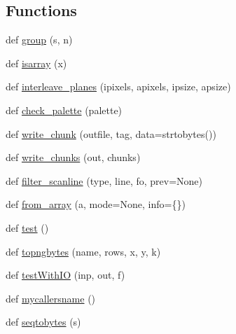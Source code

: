 \subsection*{Functions}
\begin{DoxyCompactItemize}
\item 
def \hyperlink{namespacepygame_1_1tests_1_1test__utils_1_1png_a2e2c0bbe3d6eefa01f7833d3f01041a3}{group} (s, n)
\item 
def \hyperlink{namespacepygame_1_1tests_1_1test__utils_1_1png_acd7de95dee0ef9c5568c707e8cb0582a}{isarray} (x)
\item 
def \hyperlink{namespacepygame_1_1tests_1_1test__utils_1_1png_ab4cb5af9ff32f19b67691f401d12b089}{interleave\+\_\+planes} (ipixels, apixels, ipsize, apsize)
\item 
def \hyperlink{namespacepygame_1_1tests_1_1test__utils_1_1png_a5759868289f0edd9de3d42f8fe7d8e59}{check\+\_\+palette} (palette)
\item 
def \hyperlink{namespacepygame_1_1tests_1_1test__utils_1_1png_a2f029ba4e9282e48376f1dede0ee21d1}{write\+\_\+chunk} (outfile, tag, data=strtobytes(\textquotesingle{}\textquotesingle{}))
\item 
def \hyperlink{namespacepygame_1_1tests_1_1test__utils_1_1png_ae122163baeb50475df9101b869e9cff2}{write\+\_\+chunks} (out, chunks)
\item 
def \hyperlink{namespacepygame_1_1tests_1_1test__utils_1_1png_a5ad54e74f0175e63c06f3522f5e7056d}{filter\+\_\+scanline} (type, line, fo, prev=None)
\item 
def \hyperlink{namespacepygame_1_1tests_1_1test__utils_1_1png_a418565b84a8b6f5e9b805640799d9b7d}{from\+\_\+array} (a, mode=None, info=\{\})
\item 
def \hyperlink{namespacepygame_1_1tests_1_1test__utils_1_1png_abee6308b578c5ccc25a67f44c3eb3e2c}{test} ()
\item 
def \hyperlink{namespacepygame_1_1tests_1_1test__utils_1_1png_a7955600fa57fd46e32846c5792595a12}{topngbytes} (name, rows, x, y, k)
\item 
def \hyperlink{namespacepygame_1_1tests_1_1test__utils_1_1png_a5b2401b374ce7457fc94ff10310bad69}{test\+With\+IO} (inp, out, f)
\item 
def \hyperlink{namespacepygame_1_1tests_1_1test__utils_1_1png_ab33968646e6b616b529781ea7e930004}{mycallersname} ()
\item 
def \hyperlink{namespacepygame_1_1tests_1_1test__utils_1_1png_a542cdd0a03ad991fdf4b00857e994276}{seqtobytes} (s)
\item 

\end{DoxyCompactItemize}
